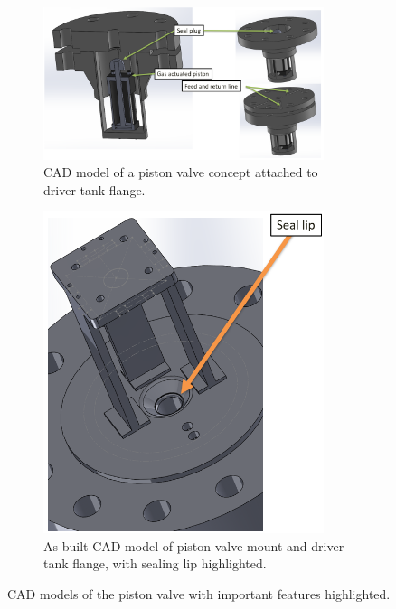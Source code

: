 \begin{figure}[tb]
    \vspace{16pt}
    \centering
    \begin{subfigure}[t]{0.6\textwidth}
        \centering
        \includegraphics[width=0.9\textwidth]{design/photos/PistonValve_Gen1_CAD_labels.PNG}
        \caption{CAD model of a piston valve concept attached to driver tank flange.}
        \label{fig:cad concept}
    \end{subfigure}
    \hfill
    \begin{subfigure}[t]{0.35\textwidth}
        \centering
        \includegraphics[width=0.9\textwidth]{design/photos/PistonMount_CAD_lip.PNG}
        \caption{As-built CAD model of piston valve mount and driver tank flange, with sealing lip highlighted.}
        \label{fig:cad lip}
    \end{subfigure}
    \caption{CAD models of the piston valve with important features highlighted.}
    \label{fig:cad gen 1}
    \vspace{16pt}
\end{figure}

